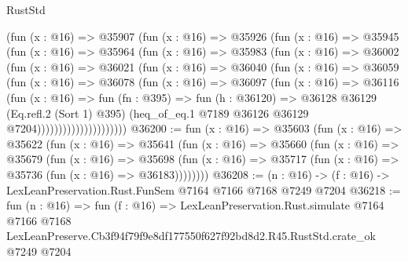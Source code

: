 \begin{lexlean}{RustStd}
\begin{coremodule}
                  (fun (x : @16) =>
                  @35907
                    (fun (x : @16) =>
                    @35926
                      (fun (x : @16) =>
                      @35945
                        (fun (x : @16) =>
                        @35964
                          (fun (x : @16) =>
                          @35983
                            (fun (x : @16) =>
                            @36002
                              (fun (x : @16) =>
                              @36021
                                (fun (x : @16) =>
                                @36040
                                  (fun (x : @16) =>
                                  @36059
                                    (fun (x : @16) =>
                                    @36078
                                      (fun (x : @16) =>
                                      @36097
                                        (fun (x : @16) =>
                                        @36116
                                          (fun (x : @16) =>
                                          fun (fn : @395) =>
                                          fun (h : @36120) =>
                                          @36128
                                            @36129
                                            (Eq.refl.{2} (Sort 1) @395)
                                            (heq_of_eq.{1}
                                              @7189
                                              @36126
                                              @36129
                                              @7204)))))))))))))))))))))
@36200 := fun (x : @16) =>
  @35603
    (fun (x : @16) =>
    @35622
      (fun (x : @16) =>
      @35641
        (fun (x : @16) =>
        @35660
          (fun (x : @16) =>
          @35679
            (fun (x : @16) =>
            @35698
              (fun (x : @16) => @35717 (fun (x : @16) => @35736 (fun (x : @16) => @36183))))))))
@36208 := (n : @16) -> (f : @16) -> LexLeanPreservation.Rust.FunSem @7164 @7166 @7168 @7249 @7204
@36218 := fun (n : @16) =>
  fun (f : @16) =>
  LexLeanPreservation.Rust.simulate
    @7164
    @7166
    @7168
    LexLeanPreserve.Cb3f94f79f9e8df177550f627f92bd8d2.R45.RustStd.crate_ok
    @7249
    @7204
\end{coremodule}
\end{lexlean}
